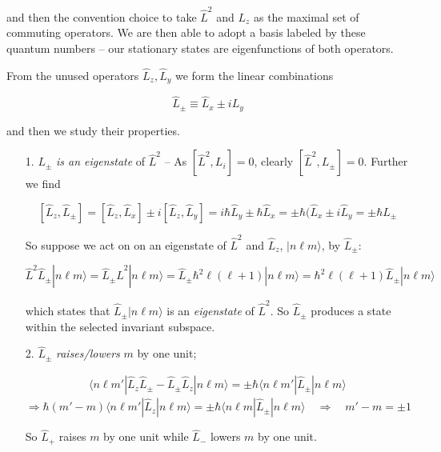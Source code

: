 and then the convention choice to take $\hat{L}^2$ and $L_z$ as the maximal set
of commuting operators. We are then able to adopt a basis labeled by these
quantum numbers -- our stationary states are eigenfunctions of both operators. 

From the unused operators $\hat{L}_z, \hat{L}_y$ we form the linear
combinations 

\[
\hat{L}_\pm \equiv \hat{L}_x \pm iL_y
\] \vspace{3px}

and then we study their properties. 


\begin{itemize}
  \item[1.] $L_\pm$ \textit{is an eigenstate} of $\hat{L}^2$ -- As $[\hat{L}^2,
    L_i] = 0$, clearly $[\hat{L}^2, L_\pm] = 0$. Further we find 

    \[
      [\hat{L}_z, \hat{L}_\pm ] = [\hat{L}_z, \hat{L}_x ] \pm i [\hat{L}_z,
      \hat{L}_y] = i\hbar \hat{L}_y \pm \hbar \hat{L}_x = \pm \hbar(\hat{L}_x
      \pm i \hat{L}_y = \pm \hbar \hat{L}_\pm
    \] \vspace{3px}
    
    So suppose we act on on an eigenstate of $\hat{L}^2$ and $\hat{L}_z$,
    $|n\ell m\rangle$, by $\hat{L}_\pm$: 

    \[
    \hat{L}^2 \hat{L}_\pm | n\ell m \rangle = \hat{L}_\pm \hat{L}^2 | n \ell
    m\rangle = \hat{L}_\pm \hbar^2 \ell(\ell + 1) | n \ell m \rangle = \hbar^2
    \ell(\ell+1) \hat{L}_\pm | n \ell m \rangle 
    \] \vspace{3px}
    
    which states that $\hat{L}_\pm |n \ell m \rangle$ is an \textit{eigenstate}
    of $\hat{L}^2$. So  $\hat{L}_\pm$ produces a state within the selected
    invariant subspace. 

  \item[2.] $\hat{L}_{\pm}$ \textit{raises/lowers} $m$ by one unit; 

    \begin{align*} \label{}
      \langle n \ell m' | \hat{L}_z \hat{L}_\pm - \hat{L}_\pm \hat{L}_z | n\ell
      m\rangle = \pm \hbar \langle n \ell m' | \hat{L}_\pm | n \ell m \rangle
    \end{align*} \[ \Rightarrow \hbar(m' - m) \langle n \ell m' | \hat{L}_z
    | n \ell m \rangle = \pm \hbar \langle n \ell m | \hat{L}_\pm | n \ell
    m\rangle \quad \Rightarrow \quad  m' - m = \pm 1 \] 

    So $\hat{L}_+$ raises $m$ by one unit while $\hat{L}_-$ lowers $m$ by one
    unit. 


\end{itemize}
